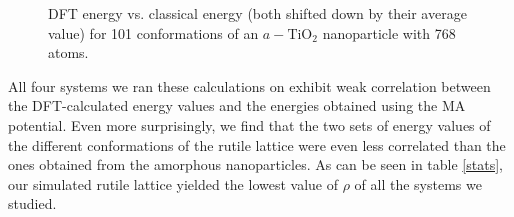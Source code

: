 \documentclass[aps,prb,twocolumn,amsmath,amssymb,superscriptaddress,longbibliography]{revtex4-1}
\newcommand\tab[1][1cm]{\hspace*{#1}} %
\begin{document}
\begin{figure}[htb]
\caption{DFT energy vs. classical energy (both shifted down by their average value) for 101 conformations of an $a-\text{TiO}_2$ nanoparticle with 768 atoms.}
\label{nnp_768}
\end{figure}
  
\tab All four systems we ran these calculations on exhibit weak correlation between the DFT-calculated energy values and the energies obtained using the MA potential. 
Even more surprisingly, we find that the two sets of energy values of the different conformations of the rutile lattice were even less correlated than the ones obtained from the amorphous nanoparticles. 
As can be seen in table \ref{stats}, our simulated rutile lattice yielded the lowest value of $\rho$ of all the systems we studied.

\end{document}
